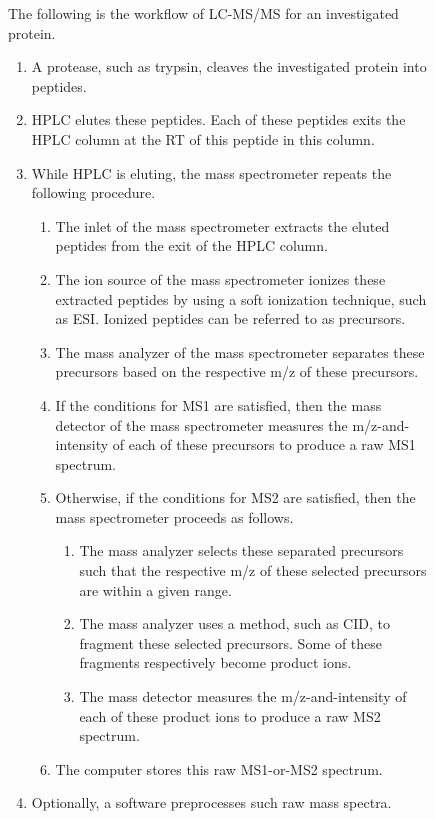 \begin{figure}
The following is the workflow of \gls{LC-MS/MS} for an investigated protein.
\begin{enumerate}[nolistsep,label={\arabic*}]
\item A protease, such as trypsin, cleaves the investigated protein into peptides.
\item \Gls{HPLC} elutes these peptides. Each of these peptides exits the \gls{HPLC} column at the \gls{RT} of this peptide in this column.
\item While \gls{HPLC} is eluting, the mass spectrometer repeats the following procedure.
\begin{enumerate}[nolistsep,label={\arabic*}]
	\item The inlet of the mass spectrometer extracts the eluted peptides from the exit of the \gls{HPLC} column.
	\item The ion source of the mass spectrometer ionizes these extracted peptides by using a soft ionization technique, such as \gls{ESI}.
	      Ionized peptides can be referred to as precursors.
	\item The mass analyzer of the mass spectrometer separates these precursors based on the respective \gls{m/z} of these precursors.
	\item If the conditions for \gls{MS1} are satisfied, 
		      then the mass detector of the mass spectrometer measures the \gls{m/z}-and-intensity of each of these precursors to produce a raw \gls{MS1} spectrum. 
	\item Otherwise, if the conditions for \gls{MS2} are satisfied, 
		      then the mass spectrometer proceeds as follows. 
	\begin{enumerate}[nolistsep,label={\arabic*}]
	\item The mass analyzer selects these separated precursors such that the respective \gls{m/z} of these selected precursors are within a given range.	
	\item The mass analyzer uses a method, such as \gls{CID}, to fragment these selected precursors. 
	      Some of these fragments respectively become product ions.
	\item The mass detector measures the \gls{m/z}-and-intensity of each of these product ions to produce a raw \gls{MS2} spectrum.
	\end{enumerate}
	\item The computer stores this raw \gls{MS1}-or-\gls{MS2} spectrum.
\end{enumerate}
\item Optionally, a software preprocesses such raw mass spectra.

\end{enumerate}
\end{figure}
